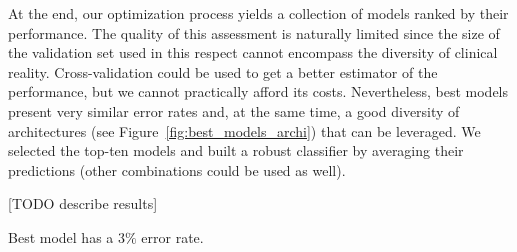 
At the end, our optimization process yields a collection of models ranked by their performance. The quality of this assessment is naturally limited since the size of the validation set used in this respect cannot encompass the diversity of clinical reality. Cross-validation could be used to get a better estimator of the performance, but we cannot practically afford its costs. Nevertheless, best models present very similar error rates and, at the same time, a good diversity of architectures (see Figure~\ref{fig:best_models_archi}) that can be leveraged. We selected the top-ten models and built a robust classifier by averaging their predictions (other combinations could be used as well).

[TODO describe results]

Best model has a $3 \%$ error rate.

